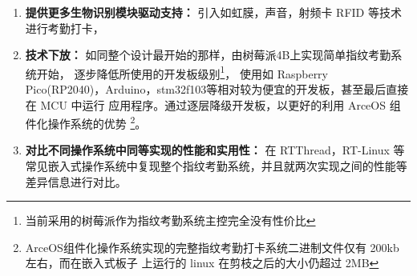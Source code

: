     \begin{enumerate}
        \item \textbf{提供更多生物识别模块驱动支持：} 引入如虹膜，声音，射频卡 RFID 等技术进行考勤打卡，
        \item \textbf{技术下放：} 如同整个设计最开始的那样，由树莓派4B上实现简单指纹考勤系统开始，
        逐步降低所使用的开发板级别\footnote{当前采用的树莓派作为指纹考勤系统主控完全没有性价比}，
        使用如 Raspberry Pico(RP2040)，Arduino，stm32f103等相对较为便宜的开发板，甚至最后直接在 MCU 中运行
        应用程序。通过逐层降级开发板，以更好的利用 ArceOS 组件化操作系统的优势
        \footnote{ArceOS组件化操作系统实现的完整指纹考勤打卡系统二进制文件仅有 200kb 左右，而在嵌入式板子
        上运行的 linux 在剪枝之后的大小仍超过 2MB}。
        \item \textbf{对比不同操作系统中同等实现的性能和实用性：}
        在 RTThread，RT-Linux 等常见嵌入式操作系统中复现整个指纹考勤系统，并且就两次实现之间的性能等差异信息进行对比。
        
    \end{enumerate}